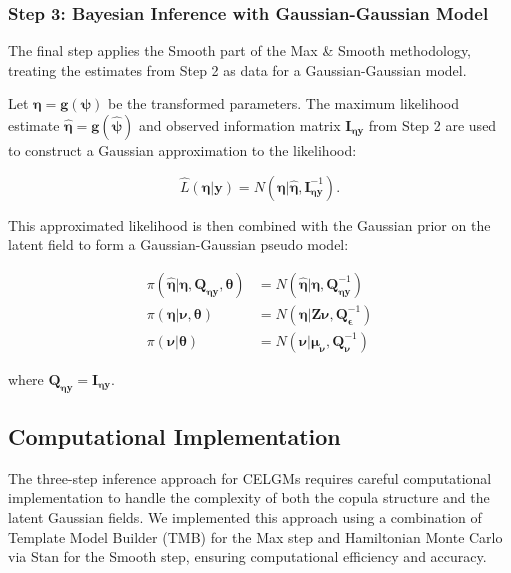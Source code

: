 \subsubsection{Step 3: Bayesian Inference with Gaussian-Gaussian Model}
The final step applies the Smooth part of the Max \& Smooth methodology, treating the estimates from Step 2 as data for a Gaussian-Gaussian model.

Let $\boldsymbol{\eta} = \mathbf{g}(\boldsymbol{\psi})$ be the transformed parameters. The maximum likelihood estimate $\hat{\boldsymbol{\eta}} = \mathbf{g}(\hat{\boldsymbol{\psi}})$ and observed information matrix $\mathbf{I}_{\boldsymbol{\eta}\mathbf{y}}$ from Step 2 are used to construct a Gaussian approximation to the likelihood:

\begin{equation}
    \hat{L}(\boldsymbol{\eta}|\mathbf{y}) = N(\boldsymbol{\eta}|\hat{\boldsymbol{\eta}}, \mathbf{I}_{\boldsymbol{\eta}\mathbf{y}}^{-1}).
\end{equation}

This approximated likelihood is then combined with the Gaussian prior on the latent field to form a Gaussian-Gaussian pseudo model:

\begin{align}
    \pi(\hat{\boldsymbol{\eta}}|\boldsymbol{\eta}, \mathbf{Q}_{\boldsymbol{\eta}\mathbf{y}}, \boldsymbol{\theta}) &= N(\hat{\boldsymbol{\eta}}|\boldsymbol{\eta}, \mathbf{Q}_{\boldsymbol{\eta}\mathbf{y}}^{-1}) \\
    \pi(\boldsymbol{\eta}|\boldsymbol{\nu}, \boldsymbol{\theta}) &= N(\boldsymbol{\eta}|\mathbf{Z}\boldsymbol{\nu}, \mathbf{Q}_{\boldsymbol{\epsilon}}^{-1}) \\
    \pi(\boldsymbol{\nu}|\boldsymbol{\theta}) &= N(\boldsymbol{\nu}|\boldsymbol{\mu}_{\boldsymbol{\nu}}, \mathbf{Q}_{\boldsymbol{\nu}}^{-1})
\end{align}

where $\mathbf{Q}_{\boldsymbol{\eta}\mathbf{y}} = \mathbf{I}_{\boldsymbol{\eta}\mathbf{y}}$.

\subsection{Computational Implementation}
The three-step inference approach for CELGMs requires careful computational implementation to handle the complexity of both the copula structure and the latent Gaussian fields. We implemented this approach using a combination of Template Model Builder (TMB) for the Max step and Hamiltonian Monte Carlo via Stan for the Smooth step, ensuring computational efficiency and accuracy.

